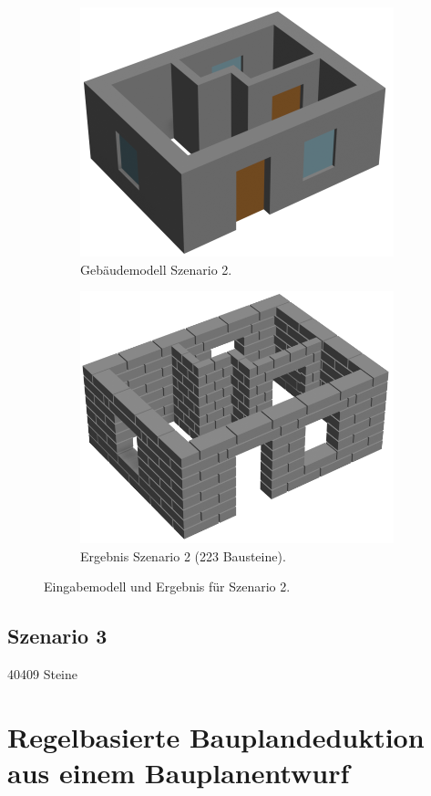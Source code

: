 \begin{figure}[htb]
  \begin{subfigure}[b]{0.49\columnwidth}
    \includegraphics[width=\columnwidth]{fig/scenario2_rendering_input.png}
    \caption{Gebäudemodell Szenario 2.}\label{fig:poc:scenario2 modell}
  \end{subfigure}
  \hfill
  \begin{subfigure}[b]{0.49\columnwidth}
    \includegraphics[width=\columnwidth]{fig/scenario2_render.png}
    \caption{Ergebnis Szenario 2 (223 Bausteine).}\label{fig:poc:scenario2_ergebnis}
  \end{subfigure}
\caption{Eingabemodell und Ergebnis für Szenario 2.}\label{fig:poc:result_scenario2}
\end{figure}

\subsection{Szenario 3}\label{poc:scenario3}
40409 Steine
\section{Regelbasierte Bauplandeduktion aus einem Bauplanentwurf}